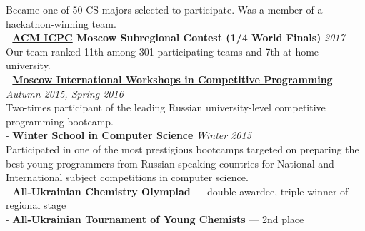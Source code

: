 \documentclass[11pt]{res}
\newcommand{\vmarginsmall}{\vspace{0.1cm}}
\newcommand{\vmargin}{\vspace{0.3cm}}
\begin{document}
\begin{resume}
\hphantom{-} Became one of 50 CS majors selected to participate. Was a member of a hackathon-winning team.\vmarginsmall\\
- \textbf{\href{https://icpc.baylor.edu/}{ACM ICPC} Moscow Subregional Contest (1/4 World Finals)} \hfill{} \textit{2017}\\
\hphantom{-} Our team ranked 11th among 301 participating teams and 7th at home university.\vmarginsmall\\
- \textbf{\href{https://it-edu.mipt.ru/pages/workshops/?lang=en}{Moscow International Workshops in Competitive Programming}} \hfill{} \textit{Autumn 2015, Spring 2016}\\
\hphantom{-}  Two-times participant of the leading Russian university-level competitive programming bootcamp.\vmarginsmall\\
- \textbf{\href{https://it-edu.mipt.ru/pages/workshops/?lang=en}{Winter School in Computer Science}} \hfill{} \textit{Winter 2015}\\
\hphantom{-} Participated in one of the most prestigious bootcamps targeted on preparing the best young programmers 
\hphantom{-} from Russian-speaking countries for National and International subject competitions in computer science.\vmarginsmall\\
- \textbf{All-Ukrainian Chemistry Olympiad} — double awardee, triple winner of regional stage\\
- \textbf{All-Ukrainian Tournament of Young Chemists} — 2nd place

\end{resume}
\end{document}
